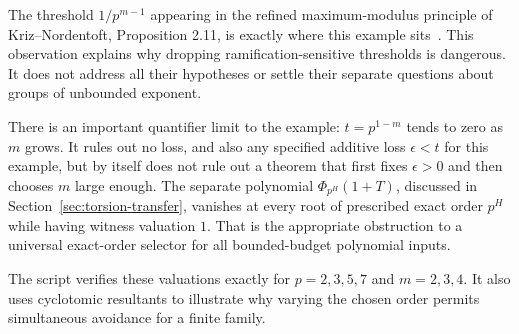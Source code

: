 The threshold \(1/p^{m-1}\) appearing in the refined maximum-modulus
principle of Kriz--Nordentoft, Proposition 2.11, is exactly where this
example sits~\cite{kn}. This observation explains why dropping
ramification-sensitive thresholds is dangerous. It does not address all
their hypotheses or settle their separate questions about groups of
unbounded exponent.

There is an important quantifier limit to the example: \(t=p^{1-m}\)
tends to zero as \(m\) grows. It rules out no loss, and also any specified
additive loss \(\epsilon<t\) for this example, but by itself does not rule
out a theorem that first fixes \(\epsilon>0\) and then chooses \(m\)
large enough. The separate polynomial
\(\Phi_{p^H}(1+T)\), discussed in Section~\ref{sec:torsion-transfer},
vanishes at every root of prescribed exact order \(p^H\) while having
witness valuation \(1\). That is the appropriate obstruction to a
universal exact-order selector for all bounded-budget polynomial inputs.

The script  verifies these valuations
exactly for \(p=2,3,5,7\) and \(m=2,3,4\). It also uses cyclotomic
resultants to illustrate why varying the chosen order permits
simultaneous avoidance for a finite family.

